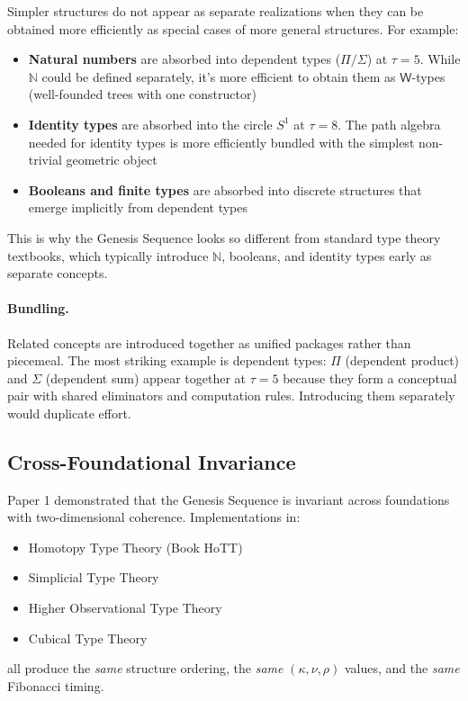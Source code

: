 \documentclass[11pt]{article}
\theoremstyle{definition}
\begin{document}
Simpler structures do not appear as separate realizations when they can be obtained more efficiently as special cases of more general structures. For example:
\begin{itemize}
\item \textbf{Natural numbers} are absorbed into dependent types ($\Pi/\Sigma$) at $\tau=5$. While $\mathbb{N}$ could be defined separately, it's more efficient to obtain them as $\mathsf{W}$-types (well-founded trees with one constructor)
\item \textbf{Identity types} are absorbed into the circle $S^1$ at $\tau=8$. The path algebra needed for identity types is more efficiently bundled with the simplest non-trivial geometric object
\item \textbf{Booleans and finite types} are absorbed into discrete structures that emerge implicitly from dependent types
\end{itemize}

This is why the Genesis Sequence looks so different from standard type theory textbooks, which typically introduce $\mathbb{N}$, booleans, and identity types early as separate concepts.

\paragraph{Bundling.}

Related concepts are introduced together as unified packages rather than piecemeal. The most striking example is dependent types: $\Pi$ (dependent product) and $\Sigma$ (dependent sum) appear together at $\tau=5$ because they form a conceptual pair with shared eliminators and computation rules. Introducing them separately would duplicate effort.

\subsection{Cross-Foundational Invariance}

Paper 1 demonstrated that the Genesis Sequence is invariant across foundations with two-dimensional coherence. Implementations in:
\begin{itemize}
\item Homotopy Type Theory (Book HoTT)
\item Simplicial Type Theory  
\item Higher Observational Type Theory
\item Cubical Type Theory
\end{itemize}
all produce the \emph{same} structure ordering, the \emph{same} $(\kappa, \nu, \rho)$ values, and the \emph{same} Fibonacci timing.
\end{document}
